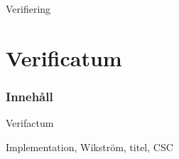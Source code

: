 \begin{frame}{Verifiering}

\begin{center}
\end{center}

\end{frame}

\section{Verificatum}
\begin{frame}
\frametitle{Innehåll}
\tableofcontents[currentsection]
\end{frame}

\begin{frame}{Verifactum}

Implementation, Wikström, titel, CSC

\end{frame}
